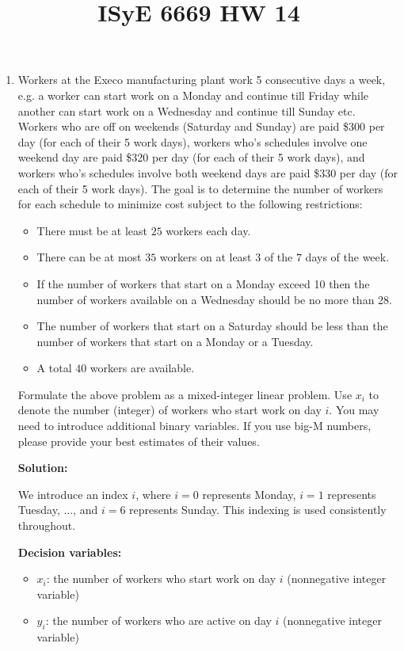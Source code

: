 \documentclass{article}
\title{ISyE 6669 HW 14}
\date{}
\begin{document}
\maketitle

\begin{enumerate}

\item Workers at the Execo manufacturing plant work 5 consecutive days a week, e.g. a worker can start work on a Monday and continue till Friday while another can start work on a Wednesday and continue till Sunday etc. Workers who are off on weekends (Saturday and Sunday) are paid \$300 per day (for each of their 5 work days), workers who’s schedules involve one weekend day are paid \$320 per day (for each of their 5 work days), and workers who’s schedules involve both weekend days are paid \$330 per day (for each of their 5 work days). The goal is to determine the number of workers for each schedule to minimize cost subject to the following restrictions:
\begin{itemize}
\item There must be at least $25$ workers each day.
\item There can be at most $35$ workers on at least $3$ of the $7$ days of the week.
\item If the number of workers that start on a Monday exceed 10 then the number of workers available on a Wednesday should be no more than 28.
\item The number of workers that start on a Saturday should be less than the number of workers that start on a Monday or a Tuesday.
\item A total $40$ workers are available.
\end{itemize}
Formulate the above problem as a mixed-integer linear problem. Use $x_i$ to denote the number (integer) of workers who start work on day $i$. You may need to introduce additional binary variables. If you use big-M numbers, please provide your best estimates of their values.

\textbf{Solution:}

We introduce an index $i$, where $i = 0$ represents Monday, $i = 1$ represents Tuesday, ..., and $i = 6$ represents Sunday. This indexing is used consistently throughout.

\textbf{Decision variables:}
\begin{itemize}
    \item $x_i$: the number of workers who start work on day $i$ (nonnegative integer variable)
    \item $y_i$: the number of workers who are active on day $i$ (nonnegative integer variable)
\end{itemize}


\end{enumerate}
\end{document}
